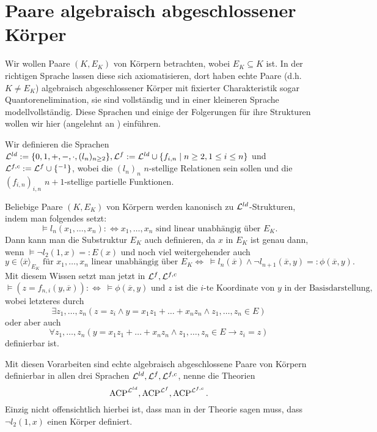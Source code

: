     \section{Paare algebraisch abgeschlossener Körper}
    Wir wollen Paare $(K,E_K)$ von Körpern betrachten, wobei $E_K\subseteq K$ ist. In der richtigen Sprache lassen diese sich axiomatisieren, dort haben echte Paare (d.h. $K\neq E_K$) algebraisch abgeschlossener Körper mit fixierter Charakteristik sogar Quantoren\-elimination, sie sind vollständig und in einer kleineren Sprache modellvollständig. Diese Sprachen und einige der Folgerungen für ihre Strukturen wollen wir hier (angelehnt an \cite{Delon}) einführen.
    
    \begin{definition}
    	Wir definieren die Sprachen $\mathcal{L}^{ld}:=\{0,1,+,-,\cdot,(l_n)_{n\geq2}\},\mathcal{L}^f:=\mathcal{L}^{ld}\cup\{f_{i,n}\mid n\geq2,1\leq i\leq n\}$ und $\mathcal{L}^{f,c}:=\mathcal{L}^f\cup\{^{-1}\}$, wobei die $(l_n)_n$ $n$-stellige Relationen sein sollen und die $(f_{i,n})_{i,n}$ $n+1$-stellige partielle Funktionen.
    \end{definition}

    \begin{lemma}\label{Symbolik}
    	Beliebige Paare $(K,E_K)$ von Körpern werden kanonisch zu $\mathcal{L}^{ld}$-Strukturen, indem man folgendes setzt:
    	$$\models l_n(x_1,\dots,x_n):\Leftrightarrow x_1,\dots,x_n\text{ sind linear unabhängig über }E_K.$$
    	Dann kann man die Substruktur $E_K$ auch definieren, da $x$ in $E_K$ ist genau dann, wenn $\models\neg l_2(1,x)=:E(x)$ und noch viel weitergehender auch $$y\in\langle\overline{x}\rangle_{E_K}\text{ für } x_1,\dots,x_n\text{ linear unabhängig über }E_K\Leftrightarrow\ \models l_n(\overline{x})\land\neg l_{n+1}(\overline{x},y)=:\phi(\overline{x},y).$$
    	Mit diesem Wissen setzt man jetzt in $\mathcal{L}^f,\mathcal{L}^{f,c}$
    	$$\models (z=f_{n,i}(y,\overline{x})):\Leftrightarrow\ \models\phi(\overline{x},y)\text{ und }z\text{ ist die }i\text{-te Koordinate von }y\text{ in der Basisdarstellung},$$
    	wobei letzteres durch $$\exists z_1,\dots,z_n(z=z_i\land y=x_1z_1+\dots+x_nz_n\land z_1,\dots,z_n\in E)$$ oder aber auch $$\forall z_1,\dots,z_n(y=x_1z_1+\dots+x_nz_n\land z_1,\dots,z_n\in E\rightarrow z_i=z)$$ definierbar ist.
    \end{lemma}
    \newpage
    \begin{lemma}
    	Mit diesen Vorarbeiten sind echte algebraisch abgeschlossene Paare von Körpern definierbar in allen drei Sprachen $\mathcal{L}^{ld},\mathcal{L}^f,\mathcal{L}^{f,c}$, nenne die Theorien $$\operatorname{ACP}^{\mathcal{L}^{ld}},\operatorname{ACP}^{\mathcal{L}^f},\operatorname{ACP}^{\mathcal{L}^{f,c}}.$$ Einzig nicht offensichtlich hierbei ist, dass man in der Theorie sagen muss, dass $\neg l_2(1,x)$ einen Körper definiert.
    \end{lemma}
    
